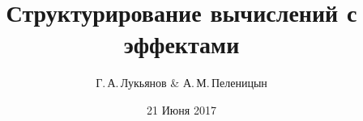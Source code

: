 

\usepackage[cache=false]{minted}

\title[]{Структурирование вычислений с эффектами}

\subtitle{}




\author[Г.\,А.\,Лукьянов \& А.\,М.\,Пеленицын]
{%
  {Г.\,А.\,Лукьянов \& А.\,М.\,Пеленицын}
}

\date{21 Июня 2017}%




\begin{frame}
\titlepage
\end{frame}


